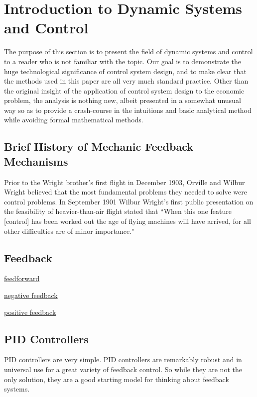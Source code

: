 \section{Introduction to Dynamic Systems and Control}
\label{section:dynamic_systems_and_control}

The purpose of this section is to present the field of dynamic systems and control to a reader who
is not familiar with the topic. Our goal is to demonstrate the huge technological significance of
control system design, and to make clear that the methods used in this paper are all very much
standard practice. Other than the original insight of the application of control system design to
the economic problem, the analysis is nothing new, albeit presented in a somewhat unusual way so as
to provide a crash-course in the intuitions and basic analytical method while avoiding formal
mathematical methods.

\subsection{Brief History of Mechanic Feedback Mechanisms}


Prior to the Wright brother's first flight in December 1903, Orville and Wilbur Wright believed that
the most fundamental problems they needed to solve were control problems. In September 1901 Wilbur
Wright's first public presentation on the feasibility of heavier-than-air flight stated that ``When
this one feature [control] has been worked out the age of flying machines will have arrived, for all
other difficulties are of minor importance."\cite{wright1908}

\subsection{Feedback}

\underline{feedforward}

\underline{negative feedback}

\underline{positive feedback}

\subsection{PID Controllers}

PID controllers are very simple. PID controllers are remarkably robust and in universal use for a
great variety of feedback control. So while they are not the only solution, they are a good starting
model for thinking about feedback systems.


